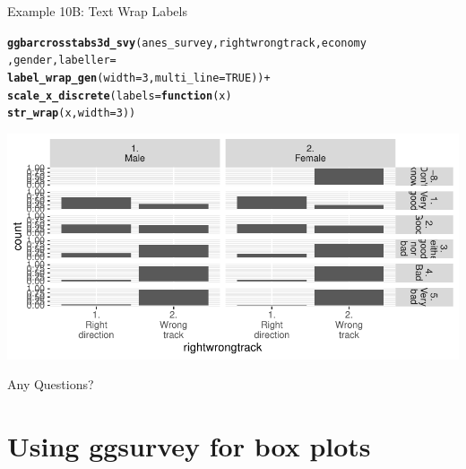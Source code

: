 \documentclass{beamer}\usepackage[]{graphicx}\usepackage[]{xcolor}
\makeatletter
\newcommand{\hlnum}[1]{\textcolor[rgb]{0.686,0.059,0.569}{#1}}%
\newcommand{\hlopt}[1]{\textcolor[rgb]{0,0,0}{#1}}%
\newcommand{\hlstd}[1]{\textcolor[rgb]{0.345,0.345,0.345}{#1}}%
\newcommand{\hlkwa}[1]{\textcolor[rgb]{0.161,0.373,0.58}{\textbf{#1}}}%
\newcommand{\hlkwc}[1]{\textcolor[rgb]{0.333,0.667,0.333}{#1}}%
\newcommand{\hlkwd}[1]{\textcolor[rgb]{0.737,0.353,0.396}{\textbf{#1}}}%
\newenvironment{kframe}{%
 \def\at@end@of@kframe{}%
 \ifinner\ifhmode%
  \def\at@end@of@kframe{\end{minipage}}%
  \begin{minipage}{\columnwidth}%
 \fi\fi%
 \def\FrameCommand##1{\hskip\@totalleftmargin \hskip-\fboxsep
 \colorbox{shadecolor}{##1}\hskip-\fboxsep
     \hskip-\linewidth \hskip-\@totalleftmargin \hskip\columnwidth}%
 \MakeFramed {\advance\hsize-\width
   \@totalleftmargin\z@ \linewidth\hsize
   \@setminipage}}%
 {\par\unskip\endMakeFramed%
 \at@end@of@kframe}
\newenvironment{knitrout}{}{} %
\makeatother
\begin{document}
\begin{frame}[fragile]{Example 10B: Text Wrap Labels}

\begin{knitrout}
\color{fgcolor}\begin{kframe}
\begin{alltt}
\hlkwd{ggbarcrosstabs3d_svy}\hlstd{(anes_survey, rightwrongtrack, economy}
\hlstd{, gender,}  \hlkwc{labeller} \hlstd{=}
  \hlkwd{label_wrap_gen}\hlstd{(}\hlkwc{width} \hlstd{=} \hlnum{3}\hlstd{,} \hlkwc{multi_line} \hlstd{=} \hlnum{TRUE}\hlstd{))} \hlopt{+}
  \hlkwd{scale_x_discrete}\hlstd{(}\hlkwc{labels} \hlstd{=} \hlkwa{function}\hlstd{(}\hlkwc{x}\hlstd{)}
    \hlkwd{str_wrap}\hlstd{(x,} \hlkwc{width} \hlstd{=} \hlnum{3}\hlstd{))}
\end{alltt}
\end{kframe}
\includegraphics[width=0.95\linewidth]{figure/unnamed-chunk-62-1} 
\end{knitrout}
\end{frame}

\begin{frame}{Any Questions?}
\end{frame}

\section{Using ggsurvey for box plots}
\end{document}
